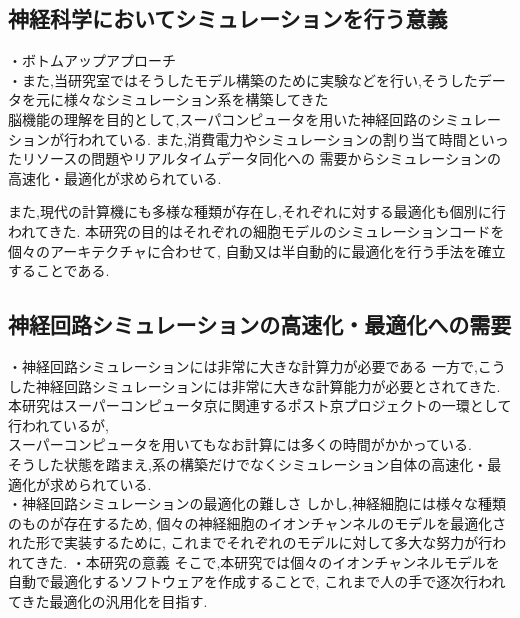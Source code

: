 \subsection{神経科学においてシミュレーションを行う意義}
・ボトムアップアプローチ\\

・また,当研究室ではそうしたモデル構築のために実験などを行い,そうしたデータを元に様々なシミュレーション系を構築してきた\\
脳機能の理解を目的として,スーパコンピュータを用いた神経回路のシミュレーションが行われている.
また,消費電力やシミュレーションの割り当て時間といったリソースの問題やリアルタイムデータ同化への
需要からシミュレーションの高速化・最適化が求められている.

また,現代の計算機にも多様な種類が存在し,それぞれに対する最適化も個別に行われてきた.
本研究の目的はそれぞれの細胞モデルのシミュレーションコードを個々のアーキテクチャに合わせて,
自動又は半自動的に最適化を行う手法を確立することである.

\subsection{神経回路シミュレーションの高速化・最適化への需要}
・神経回路シミュレーションには非常に大きな計算力が必要である
一方で,こうした神経回路シミュレーションには非常に大きな計算能力が必要とされてきた.\\
本研究はスーパーコンピュータ京に関連するポスト京プロジェクトの一環として行われているが,\\
スーパーコンピュータを用いてもなお計算には多くの時間がかかっている.\\
そうした状態を踏まえ,系の構築だけでなくシミュレーション自体の高速化・最適化が求められている.\\
・神経回路シミュレーションの最適化の難しさ
しかし,神経細胞には様々な種類のものが存在するため,
個々の神経細胞のイオンチャンネルのモデルを最適化された形で実装するために,
これまでそれぞれのモデルに対して多大な努力が行われてきた.
・本研究の意義
そこで,本研究では個々のイオンチャンネルモデルを自動で最適化するソフトウェアを作成することで,
これまで人の手で逐次行われてきた最適化の汎用化を目指す.
